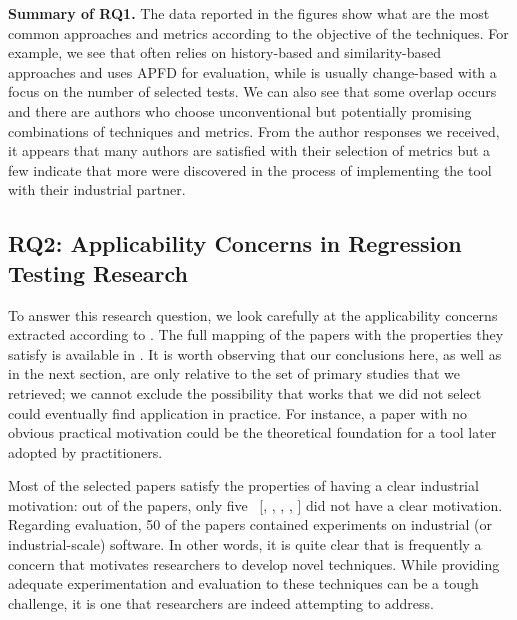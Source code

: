 \begin{tcolorbox}%
\textbf{Summary of RQ1.} The data reported in the figures show what are the most common approaches and metrics according to the objective of the \rt techniques. For example, we see that \tcp often relies on history-based and similarity-based approaches and uses APFD for evaluation, while \tcs is usually change-based with a focus on the number of selected tests.
We can also see that some overlap occurs and there are authors who choose unconventional but potentially promising combinations of techniques and metrics.
From the author responses we received, it appears that many authors are satisfied with their selection of metrics but a few indicate that more were discovered in the process of implementing the tool with their industrial partner.
\end{tcolorbox}


\subsection{RQ2: Applicability Concerns in Regression Testing Research}
\label{sec:lit_rq2}

%

To answer this research question, we look carefully at the applicability concerns extracted according to .
The full mapping of the papers with the properties they satisfy is available in .
It is worth observing that our conclusions here, as well as in the next section, are only relative to the set of primary studies that we retrieved; we cannot exclude the possibility that works that we did not select could eventually find application in practice.
For instance, a paper with no obvious practical motivation could be the theoretical foundation for a tool later adopted by practitioners.

Most of the selected papers satisfy the properties of having a clear industrial motivation: out of the \numpapers papers, only five~
[, 
,
,  
, 
] did not have a clear \rea motivation.
Regarding evaluation, 50 of the papers contained experiments on industrial (or industrial-scale) software.
In other words, it is quite clear that \rea is frequently a concern that motivates researchers to develop novel \rt techniques.
While providing adequate experimentation and evaluation to these techniques can be a tough challenge, it is one that researchers are indeed attempting to address.

